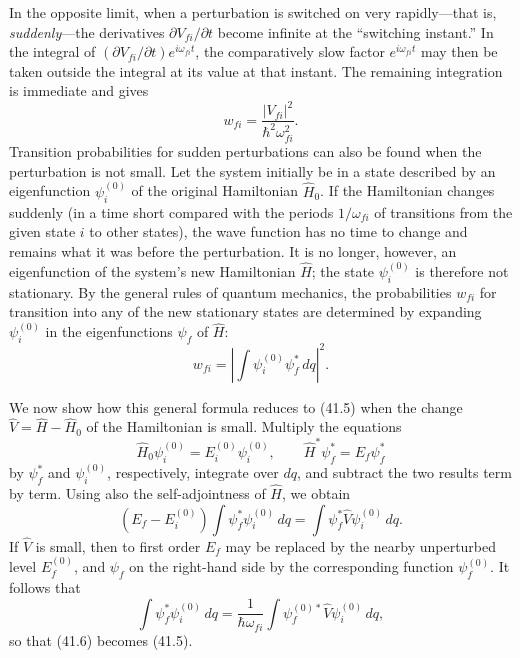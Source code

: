 In the opposite limit, when a perturbation is switched on very rapidly---that
is, \emph{suddenly}---the derivatives $\partial V_{fi}/\partial t$ become
infinite at the ``switching instant.'' In the integral of
$(\partial V_{fi}/\partial t)e^{i\omega_{fi}t}$, the comparatively slow factor
$e^{i\omega_{fi}t}$ may then be taken outside the integral at its value at
that instant. The remaining integration is immediate and gives
\begin{equation}
  w_{fi}=\frac{|V_{fi}|^2}{\hbar^2\omega_{fi}^2}.
  \tag{41.5}
\end{equation}
Transition probabilities for sudden perturbations can also be found when the
perturbation is not small.
Let the system initially be in a state described by an eigenfunction
$\psi_i^{(0)}$ of the original Hamiltonian $\hat H_0$. If the Hamiltonian
changes suddenly (in a time short compared with the periods $1/\omega_{fi}$
of transitions from the given state $i$ to other states), the wave function
has no time to change and remains what it was before the perturbation. It is
no longer, however, an eigenfunction of the system's new Hamiltonian $\hat H$;
the state $\psi_i^{(0)}$ is therefore not stationary. By the general rules of
quantum mechanics, the probabilities $w_{fi}$ for transition into any of the
new stationary states are determined by expanding $\psi_i^{(0)}$ in the
eigenfunctions $\psi_f$ of $\hat H$:
\begin{equation}
  w_{fi}=\left|\int\psi_i^{(0)}\psi_f^*\,dq\right|^2.
  \tag{41.6}
\end{equation}

We now show how this general formula reduces to (41.5) when the change
$\hat V=\hat H-\hat H_0$ of the Hamiltonian is small. Multiply the equations
\[
  \hat H_0\psi_i^{(0)}=E_i^{(0)}\psi_i^{(0)},\qquad
  \hat H^*\psi_f^*=E_f\psi_f^*
\]
by $\psi_f^*$ and $\psi_i^{(0)}$, respectively, integrate over $dq$, and
subtract the two results term by term. Using also the self-adjointness of
$\hat H$, we obtain
\[
  (E_f-E_i^{(0)})\int\psi_f^*\psi_i^{(0)}\,dq
  =\int\psi_f^*\hat V\psi_i^{(0)}\,dq.
\]
If $\hat V$ is small, then to first order $E_f$ may be replaced by the nearby
unperturbed level $E_f^{(0)}$, and $\psi_f$ on the right-hand side by the
corresponding function $\psi_f^{(0)}$. It follows that
\[
  \int\psi_f^*\psi_i^{(0)}\,dq
  =\frac1{\hbar\omega_{fi}}
   \int\psi_f^{(0)*}\hat V\psi_i^{(0)}\,dq,
\]
so that (41.6) becomes (41.5).

